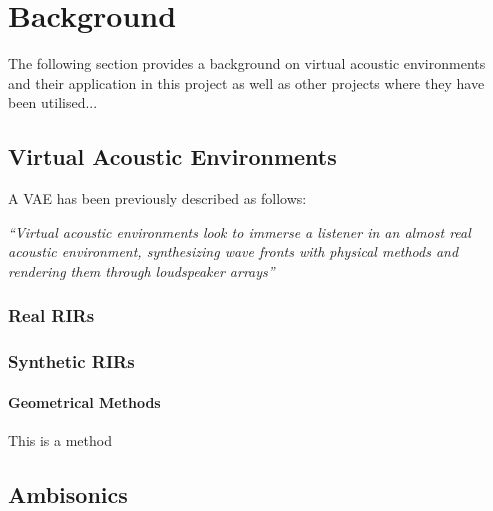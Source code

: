 \documentclass[../../main.tex]{subfiles}
\begin{document}
\section{Background}

	The following section provides a background on virtual acoustic environments and their application in this project as well as other projects where they have been utilised...

\subsection{Virtual Acoustic Environments}

	A \ac{VAE} has been previously described \cite{SalvadorCesar2010} as follows:

	\begin{center}
		\textit{``Virtual acoustic environments look to immerse a listener in an almost real acoustic environment, synthesizing wave fronts with physical methods and rendering them through loudspeaker arrays''}
	\end{center}




\subsubsection{Real RIRs}

\subsubsection{Synthetic RIRs}

\paragraph{Geometrical Methods}

This is a method

\subsection{Ambisonics}
\end{document}
